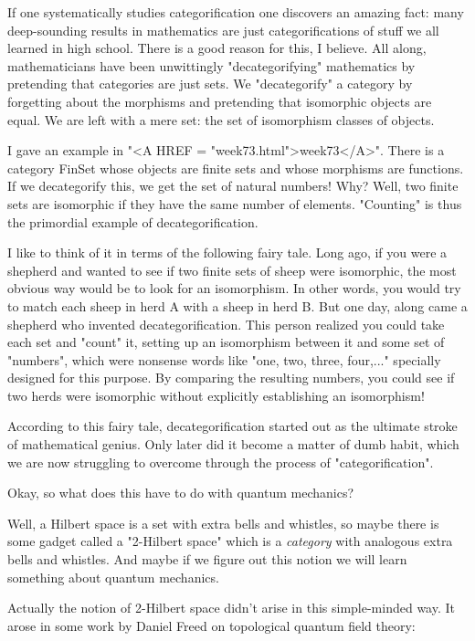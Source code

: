 If one systematically studies categorification one discovers an
amazing fact: many deep-sounding results in mathematics are just
categorifications of stuff we all learned in high school.  There is a
good reason for this, I believe.  All along, mathematicians have been
unwittingly "decategorifying" mathematics by pretending that
categories are just sets.  We "decategorify" a category by forgetting
about the morphisms and pretending that isomorphic objects are equal.
We are left with a mere set: the set of isomorphism classes of
objects.

I gave an example in "<A HREF = "week73.html">week73</A>".  There is a category FinSet whose
objects are finite sets and whose morphisms are functions.  If we
decategorify this, we get the set of natural numbers!  Why?  Well, two
finite sets are isomorphic if they have the same number of elements.
"Counting" is thus the primordial example of decategorification.  


 I like to think of it in terms of the following fairy tale.  Long
ago, if you were a shepherd and wanted to see if two finite sets of
sheep were isomorphic, the most obvious way would be to look for an
isomorphism.  In other words, you would try to match each sheep in herd
A with a sheep in herd B.  But one day, along came a shepherd who
invented decategorification.  This person realized you could take each
set and "count" it, setting up an isomorphism between it and
some set of "numbers", which were nonsense words like
"one, two, three, four,..." specially designed for this
purpose.  By comparing the resulting numbers, you could see if two herds
were isomorphic without explicitly establishing an isomorphism!

According to this fairy tale, decategorification started out as the
ultimate stroke of mathematical genius.  Only later did it become a
matter of dumb habit, which we are now struggling to overcome through
the process of "categorification".

Okay, so what does this have to do with quantum mechanics?


Well, a Hilbert space is a set with extra bells and whistles, so maybe
there is some gadget called a "2-Hilbert space" which is a
\emph{category} with analogous extra bells and whistles.  And maybe if
we figure out this notion we will learn something about quantum
mechanics.

Actually the notion of 2-Hilbert space didn't arise in this
simple-minded way.  It arose in some work by Daniel Freed on
topological quantum field theory:

